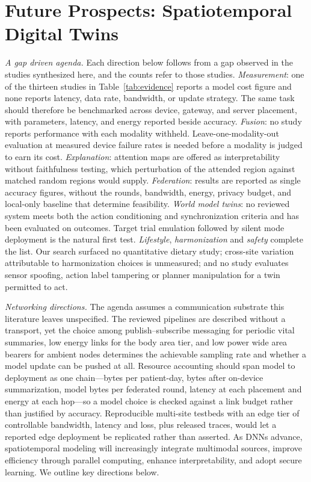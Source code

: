 \documentclass[journal]{IEEEtran}
\newif\ifsubmission
\begin{document}
\fi

\section{Future Prospects: Spatiotemporal Digital Twins}
\label{sec:future}
\ifsubmission
\emph{A gap driven agenda.} Each direction below follows from a gap observed in the studies synthesized here, and the counts refer to those studies. \emph{Measurement}: one of the thirteen studies in Table~\ref{tab:evidence} reports a model cost figure and none reports latency, data rate, bandwidth, or update strategy. The same task should therefore be benchmarked across device, gateway, and server placement, with parameters, latency, and energy reported beside accuracy. \emph{Fusion}: no study reports performance with each modality withheld. Leave-one-modality-out evaluation at measured device failure rates is needed before a modality is judged to earn its cost. \emph{Explanation}: attention maps are offered as interpretability without faithfulness testing, which perturbation of the attended region against matched random regions would supply. \emph{Federation}: results are reported as single accuracy figures, without the rounds, bandwidth, energy, privacy budget, and local-only baseline that determine feasibility. \emph{World model twins}: no reviewed system meets both the action conditioning and synchronization criteria and has been evaluated on outcomes. Target trial emulation followed by silent mode deployment is the natural first test. \emph{Lifestyle}, \emph{harmonization} and \emph{safety} complete the list. Our search surfaced no quantitative dietary study; cross-site variation attributable to harmonization choices is unmeasured; and no study evaluates sensor spoofing, action label tampering or planner manipulation for a twin permitted to act.

\emph{Networking directions.} The agenda assumes a communication substrate this literature leaves unspecified. The reviewed pipelines are described without a transport, yet the choice among publish--subscribe messaging for periodic vital summaries, low energy links for the body area tier, and low power wide area bearers for ambient nodes determines the achievable sampling rate and whether a model update can be pushed at all. Resource accounting should span model to deployment as one chain---bytes per patient-day, bytes after on-device summarization, model bytes per federated round, latency at each placement and energy at each hop---so a model choice is checked against a link budget rather than justified by accuracy. Reproducible multi-site testbeds with an edge tier of controllable bandwidth, latency and loss, plus released traces, would let a reported edge deployment be replicated rather than asserted.
\else
As DNNs advance, spatiotemporal modeling will increasingly integrate multimodal sources, improve efficiency through parallel computing, enhance interpretability, and adopt secure learning. We outline key directions below.
\end{document}
